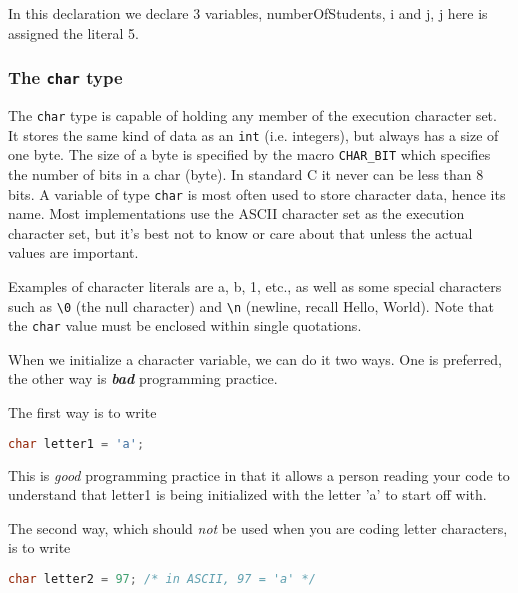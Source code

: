 In this declaration we declare 3 variables, numberOfStudents, i and j, j here
is assigned the literal 5.

\subsubsection{The \texttt{char} type}
The \texttt{char} type is capable of holding any member of the execution
character set. It stores the same kind of data as an \texttt{int} (i.e.
integers), but always has a size of one byte. The size of a byte is specified
by the macro \texttt{CHAR\_BIT} which specifies the number of bits in a char
(byte). In standard C it never can be less than 8 bits. A variable of type
\texttt{char} is most often used to store character data, hence its name. Most
implementations use the ASCII character set as the execution character set, but
it's best not to know or care about that unless the actual values are
important.

Examples of character literals are a, b, 1, etc., as well as some special
characters such as \texttt{\textbackslash{}0} (the null character) and
\texttt{\textbackslash{}n} (newline, recall Hello, World). Note that the
\texttt{char} value must be enclosed within single quotations.

When we initialize a character variable, we can do it two ways. One is
preferred, the other way is \textbf{\emph{bad}} programming practice.

The first way is to write
\lstset{basicstyle=\scriptsize, numbers=left, captionpos=b, tabsize=4}
\begin{lstlisting}[caption=Section \thesection listing \arabic{varcnt},language={C},
breaklines=true,xleftmargin=15pt,label=lst:section\thesection listing\arabic{varcnt}]
char letter1 = 'a';
\end{lstlisting}

This is \emph{good} programming practice in that it allows a person reading
your code to understand that letter1 is being initialized with the letter 'a'
to start off with.

The second way, which should \emph{not} be used when you are coding letter
characters, is to write
\lstset{basicstyle=\scriptsize, numbers=left, captionpos=b, tabsize=4}
\begin{lstlisting}[caption=Section \thesection listing \arabic{varcnt},language={C},
breaklines=true,xleftmargin=15pt,label=lst:section\thesection listing\arabic{varcnt}]
char letter2 = 97; /* in ASCII, 97 = 'a' */
\end{lstlisting}

